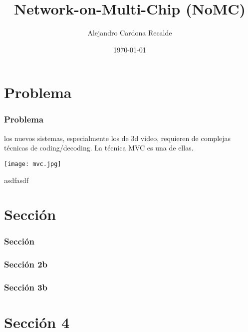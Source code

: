 \documentclass{beamer}
\title{Network-on-Multi-Chip (NoMC)}
\author{Alejandro Cardona Recalde}
\date{\today}
\begin{document}
\frame{\titlepage}

\section[\'Indice]{}
\begin{frame}[allowframebreaks]
\tableofcontents
\end{frame}

\section{Problema}
\begin{frame}[allowframebreaks]
\frametitle{Problema}
los nuevos sistemas, especialmente los de 3d video, requieren de complejas t\'ecnicas de coding/decoding. La t\'ecnica MVC es una de ellas.\\
\begin{center}
\texttt{[image: mvc.jpg]}
\end{center}
\end{frame}
\begin{frame}[allowframebreaks]
asdfasdf
\end{frame}

\section{Secci\'on}
\begin{frame}[allowframebreaks]
\frametitle{Secci\'on}
\end{frame}

\begin{frame}[allowframbreaks]
\frametitle{Sección 2b}
\end{frame}

\begin{frame}[allowframbreaks]
\frametitle{Sección 3b}
\end{frame}

\section{Secci\'on 4}
\end{document}
